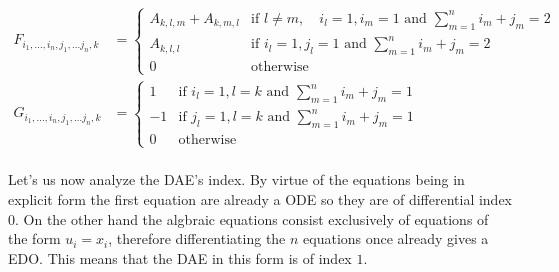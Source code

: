 \documentclass{article}
\begin{document}
\begin{align}
    F_{i_1, ..., i_n, j_1, ...j_n, k} &= \left\{
        \begin{array}{ll}
            A_{k,l,m} + A_{k,m,l} & \text{if } l \neq m, \quad i_l = 1, i_m = 1 \text{ and } \sum_{m= 1}^n i_m + j_m = 2 \\
            A_{k,l,l} & \text{if } i_l = 1, j_l = 1 \text{ and } \sum_{m= 1}^n i_m + j_m = 2 \\
            0 & \text{otherwise} 
        \end{array}
    \right.\\
    G_{i_1, ..., i_n, j_1, ...j_n, k} &= \left\{
        \begin{array}{ll}
            1 & \text{if } i_l = 1, l=k \text{ and } \sum_{m= 1}^n i_m + j_m = 1 \\
            -1 & \text{if } j_l = 1, l=k \text{ and } \sum_{m= 1}^n i_m + j_m = 1 \\
            0 & \text{otherwise} 
        \end{array}
    \right.\\
\end{align}

Let's us now analyze the DAE's index. By virtue of the equations being in 
explicit form the first equation are already a ODE so they are of differential index 0.
On the other hand the algbraic equations consist exclusively of equations of the form $u_i = x_i$, therefore differentiating the $n$ equations once already gives a EDO.
This means that the DAE in this form is of index $1$. 
\end{document}
